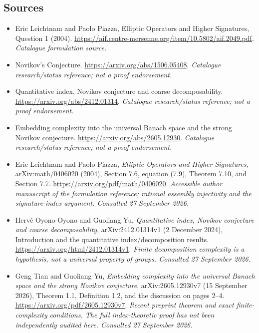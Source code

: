 \documentclass[11pt,a4paper]{article}
\numberwithin{equation}{section}
\begin{document}
\subsection{Sources}
\begin{itemize}\raggedright
\item[\textnormal{[S1]}]\hypertarget{source:56:1}{} Eric Leichtnam and Paolo Piazza, Elliptic Operators and Higher Signatures, Question 1 (2004).
\url{https://aif.centre-mersenne.org/item/10.5802/aif.2049.pdf}.
{\small\textit{Catalogue formulation source.}}
\item[\textnormal{[S2]}]\hypertarget{source:56:2}{} Novikov's Conjecture.
\url{https://arxiv.org/abs/1506.05408}.
{\small\textit{Catalogue research/status reference; not a proof endorsement.}}
\item[\textnormal{[S3]}]\hypertarget{source:56:3}{} Quantitative index, Novikov conjecture and coarse decomposability.
\url{https://arxiv.org/abs/2412.01314}.
{\small\textit{Catalogue research/status reference; not a proof endorsement.}}
\item[\textnormal{[S4]}]\hypertarget{source:56:4}{} Embedding complexity into the universal Banach space and the strong Novikov conjecture.
\url{https://arxiv.org/abs/2605.12930}.
{\small\textit{Catalogue research/status reference; not a proof endorsement.}}

\item[\textnormal{[E1]}]\hypertarget{extra:56:1}{} Eric Leichtnam and Paolo Piazza, \emph{Elliptic Operators and Higher Signatures}, arXiv:math/0406020 (2004), Section 7.6, equation (7.9), Theorem 7.10, and Section 7.7.
\url{https://arxiv.org/pdf/math/0406020}.
{\small\textit{Accessible author manuscript of the formulation reference; rational assembly injectivity and the signature-index argument. Consulted 27 September 2026.}}
\item[\textnormal{[E2]}]\hypertarget{extra:56:2}{} Herv\'e Oyono-Oyono and Guoliang Yu, \emph{Quantitative index, Novikov conjecture and coarse decomposability}, arXiv:2412.01314v1 (2 December 2024), Introduction and the quantitative index/decomposition results.
\url{https://arxiv.org/html/2412.01314v1}.
{\small\textit{Finite decomposition complexity is a hypothesis, not a universal property of groups. Consulted 27 September 2026.}}
\item[\textnormal{[E3]}]\hypertarget{extra:56:3}{} Geng Tian and Guoliang Yu, \emph{Embedding complexity into the universal Banach space and the strong Novikov conjecture}, arXiv:2605.12930v7 (15 September 2026), Theorem 1.1, Definition 1.2, and the discussion on pages 2--4.
\url{https://arxiv.org/pdf/2605.12930v7}.
{\small\textit{Recent preprint theorem and exact finite-complexity conditions. The full index-theoretic proof has not been independently audited here. Consulted 27 September 2026.}}
\end{itemize}
\end{document}
